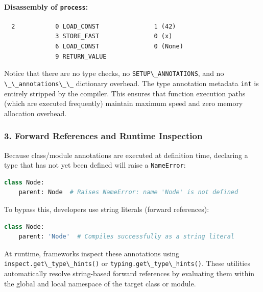 \hypertarget{disassembly-of-process}{%
\paragraph{\texorpdfstring{Disassembly of
\texttt{process}:}{Disassembly of process:}}\label{disassembly-of-process}}

\begin{lstlisting}
  2           0 LOAD_CONST               1 (42)
              3 STORE_FAST               0 (x)
              6 LOAD_CONST               0 (None)
              9 RETURN_VALUE
\end{lstlisting}

Notice that there are no type checks, no
\passthrough{\lstinline!SETUP\_ANNOTATIONS!}, and no
\passthrough{\lstinline!\_\_annotations\_\_!} dictionary overhead. The
type annotation metadata \passthrough{\lstinline!int!} is entirely
stripped by the compiler. This ensures that function execution paths
(which are executed frequently) maintain maximum speed and zero memory
allocation overhead.

\hypertarget{forward-references-and-runtime-inspection}{%
\subsubsection{3. Forward References and Runtime
Inspection}\label{forward-references-and-runtime-inspection}}

Because class/module annotations are executed at definition time,
declaring a type that has not yet been defined will raise a
\passthrough{\lstinline!NameError!}:

\begin{lstlisting}[language=Python]
class Node:
    parent: Node  # Raises NameError: name 'Node' is not defined
\end{lstlisting}

To bypass this, developers use string literals (forward references):

\begin{lstlisting}[language=Python]
class Node:
    parent: 'Node'  # Compiles successfully as a string literal
\end{lstlisting}

At runtime, frameworks inspect these annotations using
\passthrough{\lstinline!inspect.get\_type\_hints()!} or
\passthrough{\lstinline!typing.get\_type\_hints()!}. These utilities
automatically resolve string-based forward references by evaluating them
within the global and local namespace of the target class or module.

